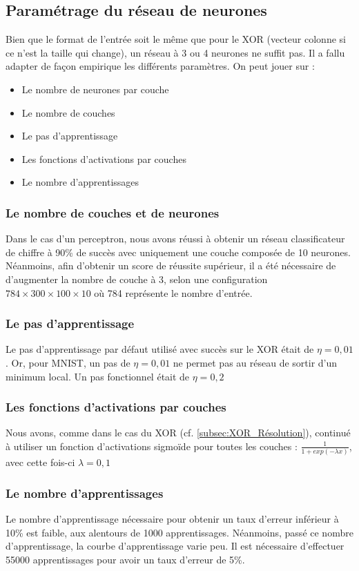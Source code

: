 \subsection{Paramétrage du réseau de neurones}
Bien que le format de l'entrée soit le même que pour le XOR (vecteur colonne si ce n'est la taille qui change), un réseau à 3 ou 4 neurones ne suffit pas. Il a fallu adapter de façon empirique les différents paramètres. On peut jouer sur :
\begin{itemize}
  \item Le nombre de neurones par couche
  \item Le nombre de couches
  \item Le pas d'apprentissage
  \item Les fonctions d'activations par couches
  \item Le nombre d'apprentissages
\end{itemize}
\subsubsection{Le nombre de couches et de neurones}
Dans le cas d'un perceptron, nous avons réussi à obtenir un réseau classificateur de chiffre à 90\% de succès avec uniquement une couche composée de 10 neurones. Néanmoins, afin d'obtenir un score de réussite supérieur, il a été nécessaire de d'augmenter la nombre de couche à 3, selon une configuration $784\times300\times100\times10$ où 784 représente le nombre d'entrée.
\subsubsection{Le pas d'apprentissage}
Le pas d'apprentissage par défaut utilisé avec succès sur le XOR était de $\eta=0,01$. Or, pour MNIST, un pas de $\eta=0,01$ ne permet pas au réseau de sortir d'un minimum local. Un pas fonctionnel était de $\eta=0,2$
\subsubsection{Les fonctions d'activations par couches}
Nous avons, comme dans le cas du XOR (cf. \ref{subsec:XOR_Résolution}), continué à utiliser un fonction d'activations sigmoïde pour toutes les couches : $\frac{1}{1+exp(-\lambda x)}$, avec cette fois-ci $\lambda=0,1$
\subsubsection{Le nombre d'apprentissages}
Le nombre d'apprentissage nécessaire pour obtenir un taux d'erreur inférieur à 10\% est faible, aux alentours de 1000 apprentissages. Néanmoins, passé ce nombre d'apprentissage, la courbe d'apprentissage varie peu. Il est nécessaire d'effectuer 55000 apprentissages pour avoir un taux d'erreur de 5\%.
